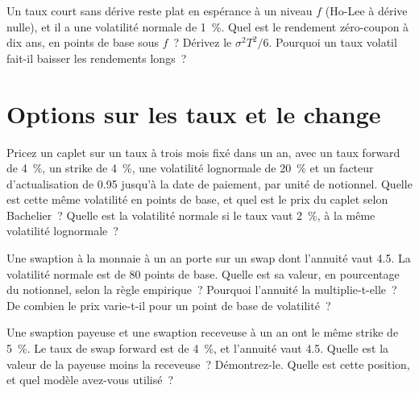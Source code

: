 \begin{question}\label{iq:iv2:rates-and-fx:25}
Un taux court sans dérive reste plat en espérance à un niveau $f$ (Ho-Lee à dérive nulle), et il a une volatilité normale de 1~\%. Quel est le rendement zéro-coupon à dix ans, en points de base sous $f$~? Dérivez le $\sigma^2T^2/6$. Pourquoi un taux volatil fait-il baisser les rendements longs~?
\end{question}

\section{Options sur les taux et le change}

\begin{question}\label{iq:iv2:rates-and-fx:26}
Pricez un caplet sur un taux à trois mois fixé dans un an, avec un taux forward de 4~\%, un strike de 4~\%, une volatilité lognormale de 20~\% et un facteur d'actualisation de 0.95 jusqu'à la date de paiement, par unité de notionnel. Quelle est cette même volatilité en points de base, et quel est le prix du caplet selon Bachelier~? Quelle est la volatilité normale si le taux vaut 2~\%, à la même volatilité lognormale~?
\end{question}

\begin{question}\label{iq:iv2:rates-and-fx:27}
Une swaption à la monnaie à un an porte sur un swap dont l'annuité vaut 4.5. La volatilité normale est de 80 points de base. Quelle est sa valeur, en pourcentage du notionnel, selon la règle empirique~? Pourquoi l'annuité la multiplie-t-elle~? De combien le prix varie-t-il pour un point de base de volatilité~?
\end{question}

\begin{question}\label{iq:iv2:rates-and-fx:28}
Une swaption payeuse et une swaption receveuse à un an ont le même strike de 5~\%. Le taux de swap forward est de 4~\%, et l'annuité vaut 4.5. Quelle est la valeur de la payeuse moins la receveuse~? Démontrez-le. Quelle est cette position, et quel modèle avez-vous utilisé~?
\end{question}

